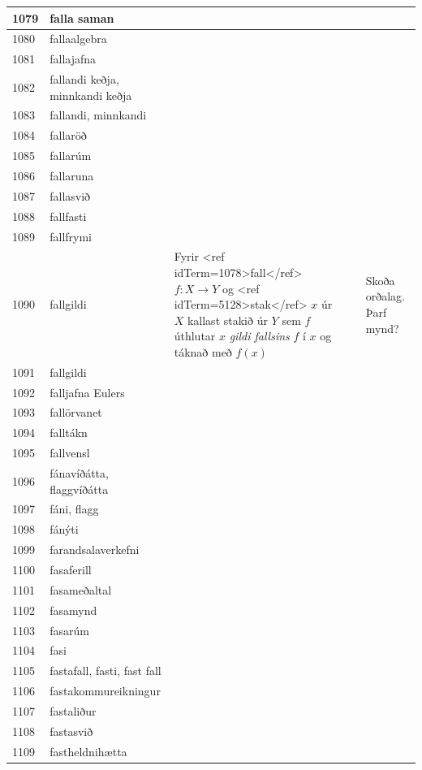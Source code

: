 \begin{longtable}{p{}|p{}|p{}|p{}|p{}}
\hline
1079 & falla saman &  &  &  \\
\hline
1080 & fallaalgebra &  &  &  \\
\hline
1081 & fallajafna &  &  &  \\
\hline
1082 & fallandi keðja, minnkandi keðja &  &  &  \\
\hline
1083 & fallandi, minnkandi &  &  &  \\
\hline
1084 & fallaröð &  &  &  \\
\hline
1085 & fallarúm &  &  &  \\
\hline
1086 & fallaruna &  &  &  \\
\hline
1087 & fallasvið &  &  &  \\
\hline
1088 & fallfasti &  &  &  \\
\hline
1089 & fallfrymi &  &  &  \\
\hline
1090 & fallgildi & Fyrir <ref idTerm=1078>fall</ref> $f : X \to Y$ og <ref idTerm=5128>stak</ref> $x$ úr $X$ kallast stakið úr $Y$ sem $f$ úthlutar $x$ \textit{gildi fallsins} $f$ í $x$ og táknað með $f(x)$ &  & Skoða orðalag. Þarf mynd? \\
\hline
1091 & fallgildi &  &  &  \\
\hline
1092 & falljafna Eulers &  &  &  \\
\hline
1093 & fallörvanet &  &  &  \\
\hline
1094 & falltákn &  &  &  \\
\hline
1095 & fallvensl &  &  &  \\
\hline
1096 & fánavíðátta, flaggvíðátta &  &  &  \\
\hline
1097 & fáni, flagg &  &  &  \\
\hline
1098 & fánýti &  &  &  \\
\hline
1099 & farandsalaverkefni &  &  &  \\
\hline
1100 & fasaferill &  &  &  \\
\hline
1101 & fasameðaltal &  &  &  \\
\hline
1102 & fasamynd &  &  &  \\
\hline
1103 & fasarúm &  &  &  \\
\hline
1104 & fasi &  &  &  \\
\hline
1105 & fastafall, fasti, fast fall &  &  &  \\
\hline
1106 & fastakommureikningur &  &  &  \\
\hline
1107 & fastaliður &  &  &  \\
\hline
1108 & fastasvið &  &  &  \\
\hline
1109 & fastheldnihætta &  &  &  \\

\end{longtable}
